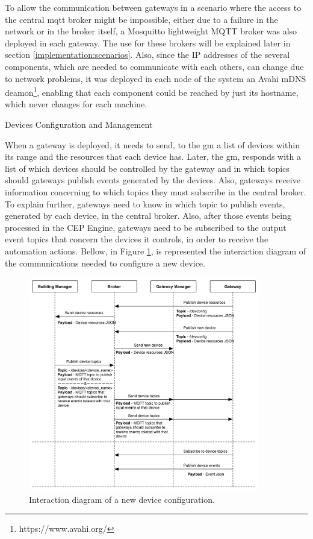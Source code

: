 To allow the communication between gateways in a scenario where the access to the central \ac{mqtt} broker might be impossible, either due to a failure in the network or in the broker itself, a Mosquitto lightweight MQTT broker was also deployed in each gateway. The use for these brokers will be explained later in section \ref{implementation:scenarios}. Also, since the IP addresses of the several components, which are needed to communicate with each others, can change due to network problems, it was deployed in each node of the system an Avahi mDNS deamon\footnote{https://www.avahi.org/}, enabling that each component could be reached by just its hostname, which never changes for each machine.


\begin{Paragraph}{Devices Configuration and Management}

When a gateway is deployed, it needs to send, to the \ac{gm} a list of devices within its range and the resources that each device has. Later, the \ac{gm}, responds with a list of which devices should be controlled by the gateway and in which topics should gateways publish events generated by the devices. Also, gateways receive information concerning to which topics they must subscribe in the central broker. To explain further, gateways need to know in which topic to publish events, generated by each device, in the central broker. Also, after those events being processed in the CEP Engine, gateways need to be subscribed to the output event topics that concern the devices it controls, in order to receive the automation actions. Bellow, in Figure \ref{fig:newdevice}, is represented the interaction diagram of the communications needed to configure a new device. 


\begin{figure}[H]
	\centering
	\includegraphics[width=0.9\textwidth]{figures/newdevice.png}
	\caption{Interaction diagram of a new device configuration.}
	\label{fig:newdevice}
\end{figure}


	
\end{Paragraph}
\newpage

